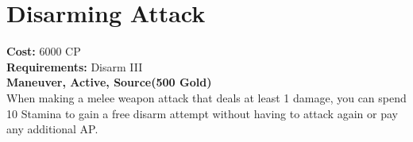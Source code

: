 \section{Disarming Attack}
\textbf{Cost:} 6000 CP\\
\textbf{Requirements:} Disarm III\\
\textbf{Maneuver, Active, Source(500 Gold)}\\
When making a melee weapon attack that deals at least 1 damage, you can spend 10 Stamina to gain a free disarm attempt without having to attack again or pay any additional AP.\\
